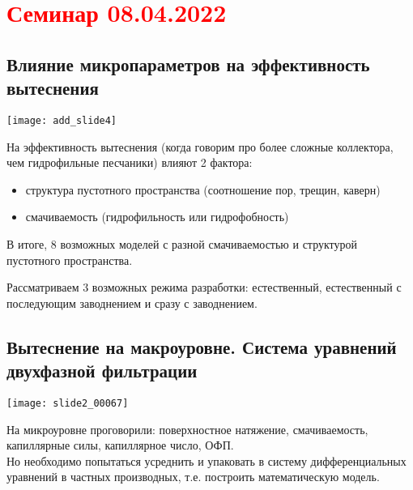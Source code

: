 \documentclass[main.tex]{subfiles}
\begin{document}
\section{\textcolor{red}{Семинар 08.04.2022}}

\subsection{Влияние микропараметров на эффективность вытеснения}

\texttt{[image: add\_slide4]}








На эффективность вытеснения (когда говорим про более сложные коллектора, чем гидрофильные песчаники) влияют 2 фактора:
\begin{itemize}
	\item структура пустотного пространства (соотношение пор, трещин, каверн)
	\item смачиваемость (гидрофильность или гидрофобность)
\end{itemize}
В итоге, 8 возможных моделей с разной смачиваемостью и структурой пустотного пространства.


Рассматриваем 3 возможных режима разработки: естественный, естественный с последующим заводнением и сразу с заводнением.


\subsection{Вытеснение на макроуровне. Система уравнений двухфазной фильтрации}

\texttt{[image: slide2\_00067]}

На микроуровне проговорили: поверхностное натяжение, смачиваемость, капиллярные силы, капиллярное число, ОФП.\\

Но необходимо попытаться усреднить и упаковать в систему дифференциальных уравнений в частных производных, т.е. построить математическую модель.
\end{document}
